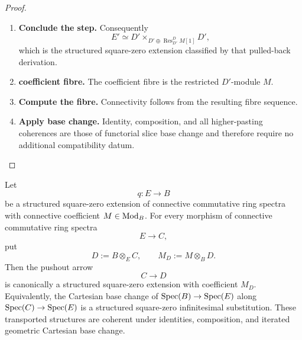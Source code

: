 \begin{proof}
\begin{enumerate}[label=\textup{(\arabic*)}]
    \item \textbf{Conclude the step.}
    Consequently
    \[
        E'
        \simeq
        D'\times_{D'\oplus\operatorname{Res}^{D}_{D'}M[1]}D',
    \]
    which is the structured square-zero extension classified by that pulled-back derivation.

    \item \textbf{coefficient fibre.}
    The coefficient fibre is the restricted \(D'\)-module \(M\).

    \item \textbf{Compute the fibre.}
    Connectivity follows from the resulting fibre sequence.

    \item \textbf{Apply base change.}
    Identity, composition, and all higher-pasting coherences are those of functorial slice base
    change and therefore require no additional compatibility datum.
\end{enumerate}
\end{proof}

\begin{theorem}
\label{thm:structured-square-zero-geometric-base-change}
Let
\[
    q:E\longrightarrow B
\]
be a structured square-zero extension of connective commutative ring spectra
with connective coefficient \(M\in\operatorname{Mod}_B\). For every morphism of connective
commutative ring spectra
\[
    E\longrightarrow C,
\]
put
\[
    D:=B\otimes_EC,
    \qquad
    M_D:=M\otimes_BD.
\]
Then the pushout arrow
\[
    C\longrightarrow D
\]
is canonically a structured square-zero extension with coefficient \(M_D\).
Equivalently, the Cartesian base change of
\(\operatorname{Spec}(B)\to\operatorname{Spec}(E)\) along \(\operatorname{Spec}(C)\to\operatorname{Spec}(E)\) is a structured
square-zero infinitesimal substitution. These transported structures are
coherent under identities, composition, and iterated geometric Cartesian base
change.
\end{theorem}

